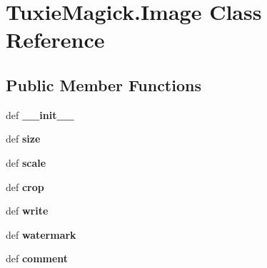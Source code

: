 \hypertarget{classTuxieMagick_1_1Image}{\section{Tuxie\-Magick.\-Image Class Reference}
\label{classTuxieMagick_1_1Image}
}
\subsection*{Public Member Functions}
\begin{DoxyCompactItemize}
\item 
\hypertarget{classTuxieMagick_1_1Image_a9e58f08527b30cbe386c8c636671ba2b}{def {\bfseries \-\_\-\-\_\-init\-\_\-\-\_\-}}\label{classTuxieMagick_1_1Image_a9e58f08527b30cbe386c8c636671ba2b}

\item 
\hypertarget{classTuxieMagick_1_1Image_a8a20b7c1cce3bd83c5b0539e96baad55}{def {\bfseries size}}\label{classTuxieMagick_1_1Image_a8a20b7c1cce3bd83c5b0539e96baad55}

\item 
\hypertarget{classTuxieMagick_1_1Image_a5395064796b9be1ef4371b416c5c0d3b}{def {\bfseries scale}}\label{classTuxieMagick_1_1Image_a5395064796b9be1ef4371b416c5c0d3b}

\item 
\hypertarget{classTuxieMagick_1_1Image_abd93c74f77e2756a9ad64f49a1b36be3}{def {\bfseries crop}}\label{classTuxieMagick_1_1Image_abd93c74f77e2756a9ad64f49a1b36be3}

\item 
\hypertarget{classTuxieMagick_1_1Image_a7dd5942307562b6e6ff2e454ac9b8789}{def {\bfseries write}}\label{classTuxieMagick_1_1Image_a7dd5942307562b6e6ff2e454ac9b8789}

\item 
\hypertarget{classTuxieMagick_1_1Image_a23e6310756d1f58cba25676aacbd04a9}{def {\bfseries watermark}}\label{classTuxieMagick_1_1Image_a23e6310756d1f58cba25676aacbd04a9}

\item 
\hypertarget{classTuxieMagick_1_1Image_ac293f26c339171cb4fc6e58dd6cc295c}{def {\bfseries comment}}\label{classTuxieMagick_1_1Image_ac293f26c339171cb4fc6e58dd6cc295c}

\end{DoxyCompactItemize}
